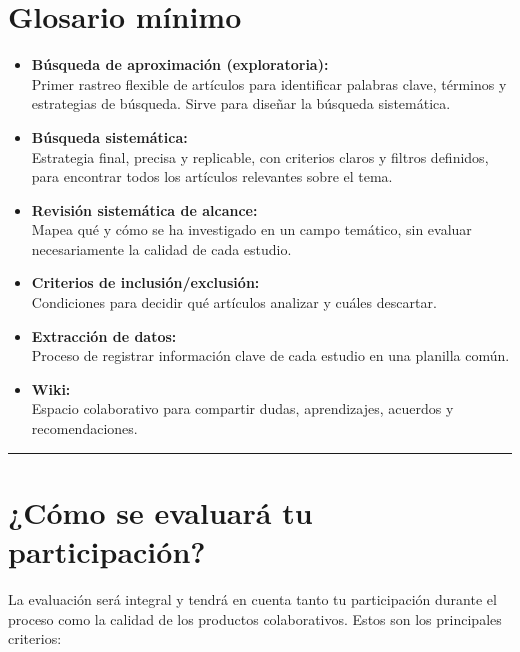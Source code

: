 \documentclass[
  letterpaper,
]{book}
\providecommand{\tightlist}{%
  \setlength{\itemsep}{0pt}\setlength{\parskip}{0pt}}\usepackage{longtable,booktabs,array}
\begin{document}
\section{Glosario mínimo}\label{glosario-muxednimo}

\begin{itemize}
\tightlist
\item
  \textbf{Búsqueda de aproximación (exploratoria):}\\
  Primer rastreo flexible de artículos para identificar palabras clave,
  términos y estrategias de búsqueda. Sirve para diseñar la búsqueda
  sistemática.
\item
  \textbf{Búsqueda sistemática:}\\
  Estrategia final, precisa y replicable, con criterios claros y filtros
  definidos, para encontrar todos los artículos relevantes sobre el
  tema.
\item
  \textbf{Revisión sistemática de alcance:}\\
  Mapea qué y cómo se ha investigado en un campo temático, sin evaluar
  necesariamente la calidad de cada estudio.
\item
  \textbf{Criterios de inclusión/exclusión:}\\
  Condiciones para decidir qué artículos analizar y cuáles descartar.
\item
  \textbf{Extracción de datos:}\\
  Proceso de registrar información clave de cada estudio en una planilla
  común.
\item
  \textbf{Wiki:}\\
  Espacio colaborativo para compartir dudas, aprendizajes, acuerdos y
  recomendaciones.
\end{itemize}

\begin{center}\rule{0.5\linewidth}{0.5pt}\end{center}

\section{¿Cómo se evaluará tu
participación?}\label{cuxf3mo-se-evaluaruxe1-tu-participaciuxf3n}

La evaluación será integral y tendrá en cuenta tanto tu participación
durante el proceso como la calidad de los productos colaborativos. Estos
son los principales criterios:
\end{document}
